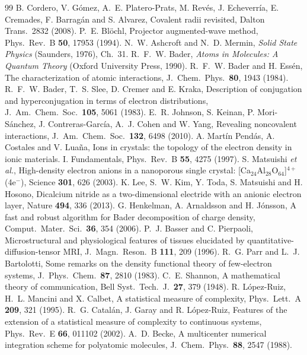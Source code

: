 \documentclass[11pt,a4paper]{article}
\begin{document}
\begin{thebibliography}{99}\small
\setlength{\itemsep}{0.2ex}
 B. Cordero, V. Gómez, A.~E. Platero-Prats, M. Revés, J. Echeverría, E. Cremades, F. Barragán and S. Alvarez, Covalent radii revisited, Dalton Trans.\ 2832 (2008).
 P.~E. Blöchl, Projector augmented-wave method, Phys.\ Rev.\ B \textbf{50}, 17953 (1994).
 N.~W. Ashcroft and N.~D. Mermin, \emph{Solid State Physics} (Saunders, 1976), Ch.~31.
 R.~F.~W. Bader, \emph{Atoms in Molecules: A Quantum Theory} (Oxford University Press, 1990).
 R.~F.~W. Bader and H. Essén, The characterization of atomic interactions, J.\ Chem.\ Phys.\ \textbf{80}, 1943 (1984).
 R.~F.~W. Bader, T.~S. Slee, D. Cremer and E. Kraka, Description of conjugation and hyperconjugation in terms of electron distributions, J.\ Am.\ Chem.\ Soc.\ \textbf{105}, 5061 (1983).
 E.~R. Johnson, S. Keinan, P. Mori-Sánchez, J. Contreras-García, A.~J. Cohen and W. Yang, Revealing noncovalent interactions, J.\ Am.\ Chem.\ Soc.\ \textbf{132}, 6498 (2010).
 A. Martín Pendás, A. Costales and V. Luaña, Ions in crystals: the topology of the electron density in ionic materials. I. Fundamentals, Phys.\ Rev.\ B \textbf{55}, 4275 (1997).
 S. Matsuishi \emph{et al.}, High-density electron anions in a nanoporous single crystal: [Ca$_{24}$Al$_{28}$O$_{64}$]$^{4+}$(4e$^-$), Science \textbf{301}, 626 (2003).
 K. Lee, S.~W. Kim, Y. Toda, S. Matsuishi and H. Hosono, Dicalcium nitride as a two-dimensional electride with an anionic electron layer, Nature \textbf{494}, 336 (2013).
 G. Henkelman, A. Arnaldsson and H. Jónsson, A fast and robust algorithm for Bader decomposition of charge density, Comput.\ Mater.\ Sci.\ \textbf{36}, 354 (2006).
 P.~J. Basser and C. Pierpaoli, Microstructural and physiological features of tissues elucidated by quantitative-diffusion-tensor MRI, J.\ Magn.\ Reson.\ B \textbf{111}, 209 (1996).
 R.~G. Parr and L.~J. Bartolotti, Some remarks on the density functional theory of few-electron systems, J.\ Phys.\ Chem.\ \textbf{87}, 2810 (1983).
 C.~E. Shannon, A mathematical theory of communication, Bell Syst.\ Tech.\ J.\ \textbf{27}, 379 (1948).
 R. López-Ruiz, H.~L. Mancini and X. Calbet, A statistical measure of complexity, Phys.\ Lett.\ A \textbf{209}, 321 (1995).
 R.~G. Catalán, J. Garay and R. López-Ruiz, Features of the extension of a statistical measure of complexity to continuous systems, Phys.\ Rev.\ E \textbf{66}, 011102 (2002).
 A.~D. Becke, A multicenter numerical integration scheme for polyatomic molecules, J.\ Chem.\ Phys.\ \textbf{88}, 2547 (1988).
\end{thebibliography}
\end{document}
